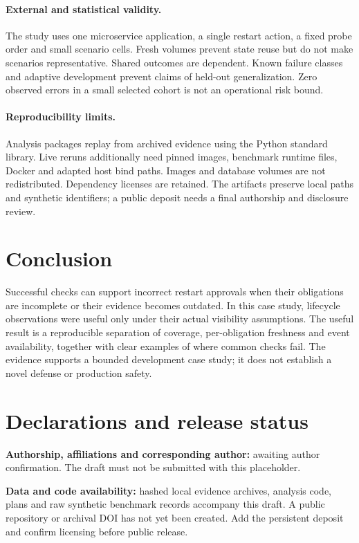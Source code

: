 \documentclass[11pt]{article}
\begin{document}
\paragraph{External and statistical validity.} The study uses one microservice application, a single restart action, a fixed probe order and small scenario cells. Fresh volumes prevent state reuse but do not make scenarios representative. Shared outcomes are dependent. Known failure classes and adaptive development prevent claims of held-out generalization. Zero observed errors in a small selected cohort is not an operational risk bound.

\paragraph{Reproducibility limits.} Analysis packages replay from archived evidence using the Python standard library. Live reruns additionally need pinned images, benchmark runtime files, Docker and adapted host bind paths. Images and database volumes are not redistributed. Dependency licenses are retained. The artifacts preserve local paths and synthetic identifiers; a public deposit needs a final authorship and disclosure review.

\section{Conclusion}
Successful checks can support incorrect restart approvals when their obligations are incomplete or their evidence becomes outdated. In this case study, lifecycle observations were useful only under their actual visibility assumptions. The useful result is a reproducible separation of coverage, per-obligation freshness and event availability, together with clear examples of where common checks fail. The evidence supports a bounded development case study; it does not establish a novel defense or production safety.

\section*{Declarations and release status}
\textbf{Authorship, affiliations and corresponding author:} awaiting author confirmation. The draft must not be submitted with this placeholder.

\textbf{Data and code availability:} hashed local evidence archives, analysis code, plans and raw synthetic benchmark records accompany this draft. A public repository or archival DOI has not yet been created. Add the persistent deposit and confirm licensing before public release.
\end{document}

